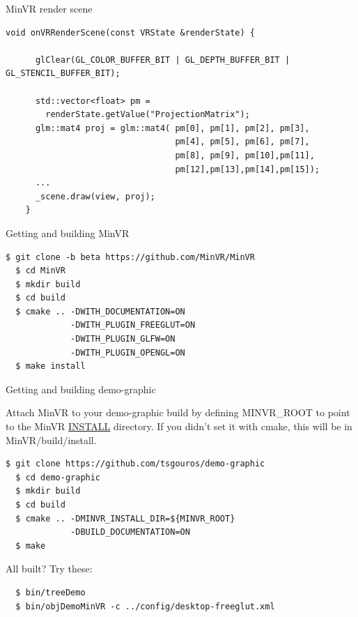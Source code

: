 \documentclass[12pt]{article}
\begin{document}
\begin{frame}[fragile]{MinVR render scene}

\begin{Verbatim}[fontsize=\small]
  void onVRRenderScene(const VRState &renderState) {

      glClear(GL_COLOR_BUFFER_BIT | GL_DEPTH_BUFFER_BIT | GL_STENCIL_BUFFER_BIT);

      std::vector<float> pm =
        renderState.getValue("ProjectionMatrix");
      glm::mat4 proj = glm::mat4( pm[0], pm[1], pm[2], pm[3],
                                  pm[4], pm[5], pm[6], pm[7],
                                  pm[8], pm[9], pm[10],pm[11],
                                  pm[12],pm[13],pm[14],pm[15]);
      ...
      _scene.draw(view, proj);
    }
  \end{Verbatim}
\end{frame}

\begin{frame}[fragile]{Getting and building MinVR}

\begin{Verbatim}[fontsize=\small]
  $ git clone -b beta https://github.com/MinVR/MinVR
  $ cd MinVR
  $ mkdir build
  $ cd build
  $ cmake .. -DWITH_DOCUMENTATION=ON
             -DWITH_PLUGIN_FREEGLUT=ON
             -DWITH_PLUGIN_GLFW=ON
             -DWITH_PLUGIN_OPENGL=ON
  $ make install
\end{Verbatim}

\end{frame}

\begin{frame}[fragile]{Getting and building demo-graphic}


Attach MinVR to your demo-graphic build by defining MINVR\_ROOT to
point to the MinVR \underline{INSTALL} directory.  If you didn't set
it with cmake, this will be in MinVR/build/install.

\begin{Verbatim}[fontsize=\small]
  $ git clone https://github.com/tsgouros/demo-graphic
  $ cd demo-graphic
  $ mkdir build
  $ cd build
  $ cmake .. -DMINVR_INSTALL_DIR=${MINVR_ROOT}
             -DBUILD_DOCUMENTATION=ON
  $ make
\end{Verbatim}

All built?  Try these:

\begin{Verbatim}
  $ bin/treeDemo
  $ bin/objDemoMinVR -c ../config/desktop-freeglut.xml
\end{Verbatim}
\end{frame}
\end{document}
